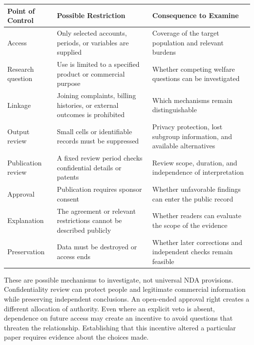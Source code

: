 \noindent \begin{table}[H]
\centering\small
\begin{tabular}{@{}
  >{\raggedright\arraybackslash}p{}
  >{\raggedright\arraybackslash}p{}
  >{\raggedright\arraybackslash}p{}@{}}
\toprule
Point of Control & Possible Restriction & Consequence to Examine \\
\midrule

Access & Only selected accounts, periods, or variables are supplied &
Coverage of the target population and relevant burdens \\
Research question & Use is limited to a specified product or commercial
purpose & Whether competing welfare questions can be investigated \\
Linkage & Joining complaints, billing histories, or external outcomes is
prohibited & Which mechanisms remain distinguishable \\
Output review & Small cells or identifiable records must be suppressed &
Privacy protection, lost subgroup information, and available
alternatives \\
Publication review & A fixed review period checks confidential details
or patents & Review scope, duration, and independence of
interpretation \\
Approval & Publication requires sponsor consent & Whether unfavorable
findings can enter the public record \\
Explanation & The agreement or relevant restrictions cannot be described
publicly & Whether readers can evaluate the scope of the evidence \\
Preservation & Data must be destroyed or access ends & Whether later
corrections and independent checks remain feasible \\
\bottomrule
\end{tabular}
\end{table}

These are possible mechanisms to investigate, not universal NDA
provisions. Confidentiality review can protect people and legitimate
commercial information while preserving independent conclusions. An
open-ended approval right creates a different allocation of authority.
Even where an explicit veto is absent, dependence on future access may
create an incentive to avoid questions that threaten the relationship.
Establishing that this incentive altered a particular paper requires
evidence about the choices made.

